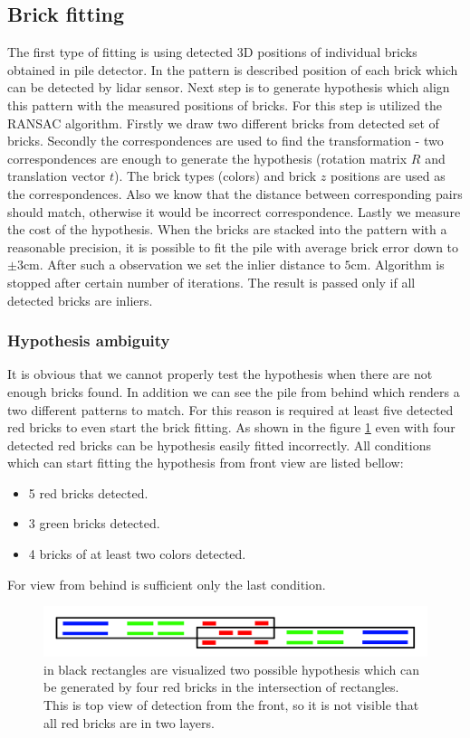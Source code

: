 \subsection{Brick fitting}
The first type of fitting is using detected 3D positions of individual bricks obtained in pile detector. In the pattern is described position of each brick which can be detected by lidar sensor. Next step is to generate hypothesis which align this pattern with the measured positions of bricks. For this step is utilized the RANSAC algorithm. Firstly we draw two different bricks from detected set of bricks. Secondly the correspondences are used to find the transformation - two correspondences are enough to generate the hypothesis (rotation matrix $R$ and translation vector $t$). The brick types (colors) and brick $z$ positions are used as the correspondences. Also we know that the distance between corresponding pairs should match, otherwise it would be incorrect correspondence. Lastly we measure the cost of the hypothesis. When the bricks are stacked into the pattern with a reasonable precision, it is possible to fit the pile with average brick error down to $\pm 3$cm. After such a observation we set the inlier distance to $5$cm. Algorithm is stopped after certain number of iterations. The result is passed only if all detected bricks are inliers.

\subsubsection{Hypothesis ambiguity}
It is obvious that we cannot properly test the hypothesis when there are not enough bricks found. In addition we can see the pile from behind which renders a two different patterns to match. For this reason is required at least five detected red bricks to even start the brick fitting. As shown in the figure \ref{fig:ambiguity} even with four detected red bricks can be hypothesis easily fitted incorrectly. All conditions which can start fitting the hypothesis from front view are listed bellow:
\begin{itemize}
\item 5 red bricks detected.
\item 3 green bricks detected.
\item 4 bricks of at least two colors detected.
\end{itemize}
For view from behind is sufficient only the last condition.
\begin{figure}[H]
\centering
\includegraphics[scale=0.3]{fig/ambiguous.png}
\caption[Hypothesis ambiguity]{in black rectangles are visualized two possible hypothesis which can be generated by four red bricks in the intersection of rectangles. This is top view of detection from the front, so it is not visible that all red bricks are in two layers.}
\label{fig:ambiguity}
\end{figure}

